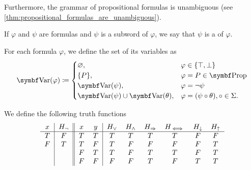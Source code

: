 \begin{definition}
  Furthermore, the grammar of propositional formulas is unambiguous (see \cref{thm:propositional_formulas_are_unambiguous}).

  If \( \varphi \) and \( \psi \) are formulas and \( \psi \) is a subword of \( \varphi \), we say that \( \psi \) is a  of \( \varphi \).

  For each formula \( \varphi \), we define the set of its variables as
  \begin{align*}
    \Bold{Var}(\varphi) \coloneqq \begin{cases}
      \varnothing,                              &\varphi \in \{ \top, \bot \} \\
      \{ P \},                                  &\varphi = P \in \Bold{Prop} \\
      \Bold{Var}(\psi),                         &\varphi = \neg \psi \\
      \Bold{Var}(\psi) \cup \Bold{Var}(\theta), &\varphi = (\psi \circ \theta), \circ \in \Sigma.
    \end{cases}
  \end{align*}
\end{definition}

\begin{definition}\label{def:truth_functions}
  We define the following truth functions
  \begin{equation*}
    \begin{tabular}{c | c || c c | c c c c c c}
      \( x \)    & \( H_\neg \) & \( x \)    & \( y \)    & \( H_\lor \) & \( H_\land \) & \( H_\Rightarrow \) & \( H_{\iff} \) & \( H_\downarrow \) & \( H_\uparrow \) \\
      \hline
      \( T \)    & \( F \)      & \( T \)    & \( T \)    & \( T \)      & \( T \)       & \( T \)          & \( T \)      & \( F \)            & \( F \)    \\
      \( F \)    & \( T \)      & \( T \)    & \( F \)    & \( T \)      & \( F \)       & \( F \)          & \( F \)      & \( F \)            & \( T \)    \\
             &          & \( F \)    & \( T \)    & \( T \)      & \( F \)       & \( T \)          & \( T \)      & \( F \)            & \( T \)    \\
             &          & \( F \)    & \( F \)    & \( F \)      & \( F \)       & \( T \)          & \( F \)      & \( T \)            & \( T \)
    \end{tabular}
  \end{equation*}
\end{definition}

